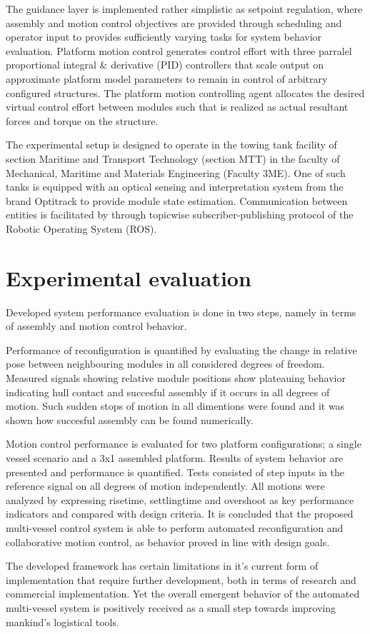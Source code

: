 The guidance layer is implemented rather simplistic as setpoint regulation, where assembly and motion control objectives are provided through scheduling and operator input to provides sufficiently varying tasks for system behavior evaluation. Platform motion control generates control effort with three parralel proportional integral \& derivative (PID) controllers that scale output on approximate platform model parameters to remain in control of arbitrary configured structures. The platform motion controlling agent allocates the desired virtual control effort between modules such that is realized as actual resultant forces and torque on the structure. 

The experimental setup is designed to operate in the towing tank facility of section Maritime and Transport Technology (section MTT) in the faculty of Mechanical, Maritime and Materials Engineering (Faculty 3ME). One of such tanks is equipped with an optical sensing and interpretation system from the brand Optitrack to provide module state estimation. Communication between entities is facilitated by through topicwise subscriber-publishing protocol of the Robotic Operating System (ROS).

\section*{Experimental evaluation}
Developed system performance evaluation is done in two steps, namely in terms of assembly and motion control behavior. 

Performance of reconfiguration is quantified by evaluating the change in relative pose between neighbouring modules in all considered degrees of freedom. Measured signals showing relative module positions show plateauing behavior indicating hull contact and succesful assembly if it occurs in all degrees of motion. Such sudden stops of motion in all dimentions were found and it was shown how succesful assembly can be found numerically.

Motion control performance is evaluated for two platform configurations; a single vessel scenario and a 3x1 assembled platform. Results of system behavior are presented and performance is quantified. Tests consisted of step inputs in the reference signal on all degrees of motion independently. All motions were analyzed by expressing risetime, settlingtime and overshoot as key performance indicators and compared with design criteria.  It is concluded that the proposed multi-vessel control system is able to perform automated reconfiguration and collaborative motion control, as behavior proved in line with design goals. 

The developed framework has certain limitations in it's current form of implementation that require further development, both in terms of research and commercial implementation. Yet the overall emergent behavior of the automated multi-vessel system is positively received as a small step towards improving mankind's logistical tools. 